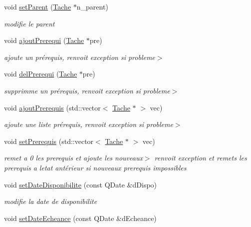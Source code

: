 \begin{DoxyCompactItemize}
\item 
void \hyperlink{class_tache_af6f744073c271d1c8bd302d1f4a8723a}{set\+Parent} (\hyperlink{class_tache}{Tache} $\ast$n\+\_\+parent)
\begin{DoxyCompactList}\small\item\em modifie le parent \end{DoxyCompactList}\item 
void \hyperlink{class_tache_ad3c79deb07748c25b6d97474571febec}{ajout\+Prerequi} (\hyperlink{class_tache}{Tache} $\ast$pre)
\begin{DoxyCompactList}\small\item\em ajoute un prérequis, renvoit exception si probleme$>$ \end{DoxyCompactList}\item 
void \hyperlink{class_tache_a96bbd20d7dcbb38ce128038190a656cd}{del\+Prerequi} (\hyperlink{class_tache}{Tache} $\ast$pre)
\begin{DoxyCompactList}\small\item\em supprimme un prérequis, renvoit exception si probleme$>$ \end{DoxyCompactList}\item 
void \hyperlink{class_tache_a68b96ac5212ecb13d0923f79da857183}{ajout\+Prerequis} (std\+::vector$<$ \hyperlink{class_tache}{Tache} $\ast$ $>$ vec)
\begin{DoxyCompactList}\small\item\em ajoute une liste prérequis, renvoit exception si probleme$>$ \end{DoxyCompactList}\item 
void \hyperlink{class_tache_a0fa9ada5b4236a1fb4f8876c3d220c59}{set\+Prerequis} (std\+::vector$<$ \hyperlink{class_tache}{Tache} $\ast$ $>$ vec)
\begin{DoxyCompactList}\small\item\em remet a 0 les prerequis et ajoute les nouveaux$>$ renvoit exception et remets les prerequis a l\textquotesingle{}etat antérieur si nouveaux prerequis impossibles \end{DoxyCompactList}\item 
void \hyperlink{class_tache_ad12e97235d69bd52f3c00c0dad21a3cf}{set\+Date\+Disponibilite} (const Q\+Date \&d\+Dispo)
\begin{DoxyCompactList}\small\item\em modifie la date de disponibilite \end{DoxyCompactList}\item 
void \hyperlink{class_tache_a73c12eb28e5130e986b3e2909735f012}{set\+Date\+Echeance} (const Q\+Date \&d\+Echeance)

\end{DoxyCompactItemize}
